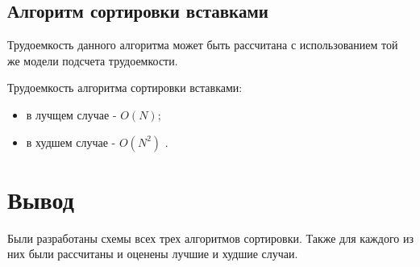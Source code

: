 \subsection{Алгоритм сортировки вставками}
Трудоемкость данного алгоритма может быть рассчитана с использованием той же модели подсчета трудоемкости.

Трудоемкость алгоритма сортировки вставками:
\begin{itemize}
	\item в лучщем случае - $O(N)$;
    \item в худшем случае - $O(N^2)$ \cite{insertion-sort}. \newline
\end{itemize}



\section*{Вывод}

Были разработаны схемы всех трех алгоритмов сортировки. Также для каждого из них были рассчитаны и оценены лучшие и худшие случаи.
